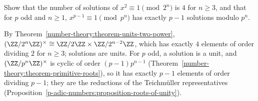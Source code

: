\begin{exercise}\label{p-adic-numbers:exercise-roots-of-unity-mod}
Show that the number of solutions of $x^2 \equiv 1 \pmod{2^n}$ is $4$ for $n \geq 3$, and that for $p$ odd and $n \geq 1$, $x^{p-1} \equiv 1 \pmod{p^n}$ has exactly $p - 1$ solutions modulo $p^n$.
\end{exercise}

\begin{solution}
By Theorem~\ref{number-theory:theorem-units-two-power}, $(\ZZ/2^n\ZZ)^\times \cong \ZZ/2\ZZ \times \ZZ/2^{n-2}\ZZ$, which has exactly $4$ elements of order dividing $2$ for $n \geq 3$; solutions are units. For $p$ odd, a
solution is a unit, and $(\ZZ/p^n\ZZ)^\times$ is cyclic of order $(p - 1)p^{n-1}$ (Theorem~\ref{number-theory:theorem-primitive-roots}), so it has exactly $p - 1$ elements of order dividing $p - 1$; they are the reductions
of the Teichm\"uller representatives (Proposition~\ref{p-adic-numbers:proposition-roots-of-unity}).
\end{solution}
